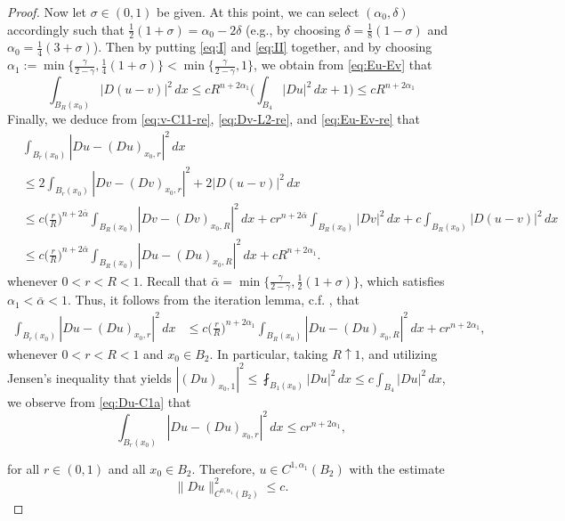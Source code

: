\documentclass[11pt]{amsart}
\theoremstyle{plain}
\theoremstyle{definition}
\theoremstyle{remark}
\numberwithin{equation}{section}
\begin{document}
\begin{proof}
Now let $\sigma \in(0,1)$ be  given. At this point, we can select $(\alpha_0,\delta)$ accordingly such that $\frac{1}{2}(1+\sigma) = \alpha_0 - 2\delta$ (e.g., by choosing $\delta = \frac{1}{8}(1-\sigma)$ and $\alpha_0 = \frac{1}{4}(3 + \sigma)$). Then by putting \eqref{eq:I} and \eqref{eq:II} together, and by choosing $\alpha_1:= \min\{\frac{\gamma}{2-\gamma},\frac{1}{4}(1+\sigma)\} < \min\{\frac{\gamma}{2-\gamma},1\}$, we obtain from \eqref{eq:Eu-Ev} that 
\begin{equation}
    \label{eq:Eu-Ev-re}
    \int_{B_{R}(x_0)} |D(u-v)|^2 \,dx \leq c{R}^{n + 2\alpha_1} \bigg(\int_{B_4}|Du|^2\,dx + 1\bigg) \leq cR^{n+2\alpha_1}
\end{equation}
Finally, we deduce from \eqref{eq:v-C11-re}, \eqref{eq:Dv-L2-re}, and \eqref{eq:Eu-Ev-re} that 
$$
    \begin{aligned}
        &\int_{B_r(x_0)} |Du - (Du)_{x_0,r}|^2\,dx \\
        &\leq 2\int_{B_r(x_0)} |Dv - (Dv)_{x_0,r}|^2 + 2 |D(u-v)|^2\,dx \\
        & \leq c \bigg(\frac{r}{R}\bigg)^{n+2\bar\alpha} \int_{B_{R}(x_0)}|Dv - (Dv)_{x_0,{R}}|^2\,dx+ cr^{n+2\bar\alpha}\int_{B_R(x_0)}|Dv|^2\,dx + c\int_{B_{R}(x_0)} |D(u - v)|^2\,dx\\
        & \leq c   \bigg(\frac{r}{R}\bigg)^{n+2\bar\alpha} \int_{B_{R}(x_0)} |Du - (Du)_{x_0,{R}}|^2\,dx + c{R}^{n + 2\alpha_1}.
    \end{aligned}
$$
whenever $0<r<R<1$.
Recall that $\bar\alpha = \min\{\frac{\gamma}{2-\gamma},\frac{1}{2}(1+\sigma)\}$, which satisfies $\alpha_1< \bar\alpha < 1$. Thus, it follows from the iteration lemma, c.f. \cite[Lemma 2.2]{GG}, that 
\begin{equation}
    \label{eq:Du-C1a}
    \begin{aligned}
    \int_{B_r(x_0)} |Du - (Du)_{x_0,r}|^2\,dx &\leq c \bigg(\frac{r}{R}\bigg)^{n+2\alpha_1} \int_{B_{R}(x_0)} |Du - (Du)_{x_0,{R}}|^2\,dx  + c  r^{n+2\alpha_1}, 
    \end{aligned}
\end{equation}
whenever $0<r<R<1$ and $x_0\in   B_2$. In particular, taking $R \uparrow 1$, and utilizing Jensen's inequality that yields $|(Du)_{x_0,1}|^2 \leq \fint_{B_1(x_0)} |Du|^2\,dx \leq c\int_{B_4} |Du|^2\,dx$, we observe from \eqref{eq:Du-C1a} that 
$$
\int_{B_r(x_0)} |Du - (Du)_{x_0,r}|^2\,dx \leq c r^{n+2\alpha_1},
$$ 

for all $r\in(0,1)$ and all $x_0\in   B_2$. Therefore, $u\in C^{1,\alpha_1}(  B_2)$ with the estimate
\begin{equation}
    \label{eq:Du-C1a-re}
\| Du\|_{C^{0,\alpha_1}(  B_2)}^2\leq c.
\end{equation}



\end{proof}
\end{document}
